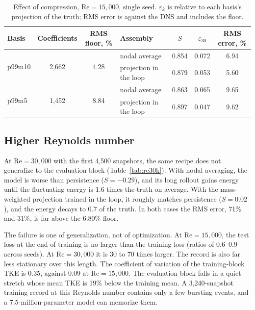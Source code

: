 \documentclass[conf]{new-aiaa}
\newcommand{\Rey}{\mathrm{Re}}
\begin{document}
\begin{table}[!tbp]
  \centering
  \caption{Effect of compression, $\Rey=15{,}000$, single seed. $\varepsilon_k$ is relative to each basis's projection of the truth; RMS error is against the DNS and includes the floor.}
  \label{tab:compression}
  \begin{tabular}{lcclccc}
    \toprule
    Basis & Coefficients & RMS floor, \% & Assembly & $S$ & $\varepsilon_{30}$ & RMS error, \% \\
    \midrule
    \multirow{2}{*}{p99m10} & \multirow{2}{*}{2,662} & \multirow{2}{*}{4.28} & nodal average & 0.854 & 0.072 & 6.94 \\
     & & & projection in the loop & 0.879 & 0.053 & 5.60 \\
    \multirow{2}{*}{p99m5} & \multirow{2}{*}{1,452} & \multirow{2}{*}{8.84} & nodal average & 0.863 & 0.065 & 9.65 \\
     & & & projection in the loop & 0.897 & 0.047 & 9.62 \\
    \bottomrule
  \end{tabular}
\end{table}

\subsection{Higher Reynolds number}
\label{sec:res_30k}
At $\Rey=30{,}000$ with the first 4,500 snapshots, the same recipe does not generalize to the evaluation block (Table~\ref{tab:re30k}). With nodal averaging, the model is worse than persistence ($S=-0.29$), and its long rollout gains energy until the fluctuating energy is 1.6 times the truth on average. With the mass-weighted projection trained in the loop, it roughly matches persistence ($S=0.02$), and the energy decays to 0.7 of the truth. In both cases the RMS error, 71\% and 31\%, is far above the 6.80\% floor.

The failure is one of generalization, not of optimization. At $\Rey=15{,}000$, the test loss at the end of training is no larger than the training loss (ratios of 0.6--0.9 across seeds). At $\Rey=30{,}000$ it is 30 to 70 times larger. The record is also far less stationary over this length. The coefficient of variation of the training-block TKE is 0.35, against 0.09 at $\Rey=15{,}000$. The evaluation block falls in a quiet stretch whose mean TKE is 19\% below the training mean. A 3,240-snapshot training record at this Reynolds number contains only a few bursting events, and a 7.5-million-parameter model can memorize them.
\end{document}
